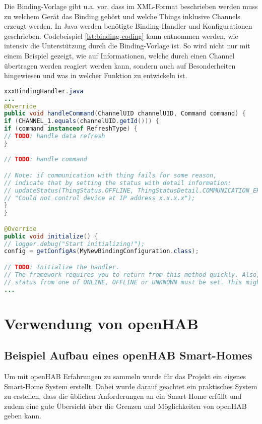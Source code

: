 Die Binding-Vorlage gibt u.a. vor, dass im XML-Format beschrieben werden muss zu welchem Gerät das Binding gehört und welche Things inklusive Channels erzeugt werden. In Java werden benötigte Binding-Handler und Konfigurationen geschrieben. Codebeispiel \ref{lst:binding-coding} kann entnommen werden, wie intensiv die Unterstützung durch die Binding-Vorlage ist. So wird nicht nur mit einem Beispiel gezeigt, wie auf Informationen, welche durch einen Channel übertragen werden reagiert werden kann, sondern auch auf Besonderheiten hingewiesen und was in welcher Funktion zu entwickeln ist.


\begin{lstlisting}[language=java,firstnumber=1,caption=Handler.java Ausschnitt,label=lst:binding-coding]
xxxBindingHandler.java
...
@Override
public void handleCommand(ChannelUID channelUID, Command command) {
if (CHANNEL_1.equals(channelUID.getId())) {
if (command instanceof RefreshType) {
// TODO: handle data refresh
}

// TODO: handle command

// Note: if communication with thing fails for some reason,
// indicate that by setting the status with detail information:
// updateStatus(ThingStatus.OFFLINE, ThingStatusDetail.COMMUNICATION_ERROR,
// "Could not control device at IP address x.x.x.x");
}
}

@Override
public void initialize() {
// logger.debug("Start initializing!");
config = getConfigAs(MyNewBindingConfiguration.class);

// TODO: Initialize the handler.
// The framework requires you to return from this method quickly. Also, before leaving this method a thing
// status from one of ONLINE, OFFLINE or UNKNOWN must be set. This might already be the real thing status in
...
\end{lstlisting}


\section{Verwendung von openHAB}
\label{s:usage-open-hab}


\subsection{Beispiel Aufbau eines openHAB Smart-Homes}
	Um mit openHAB Erfahrungen zu sammeln wurde für das Projekt ein eigenes Smart-Home System erstellt. Dabei wurde darauf geachtet ein praktisches System zu erstellen, dass die üblichen Anforderungen an ein Smart-Home erfüllt und zudem eine gute Übersicht über die Grenzen und Möglichkeiten von openHAB geben kann.

